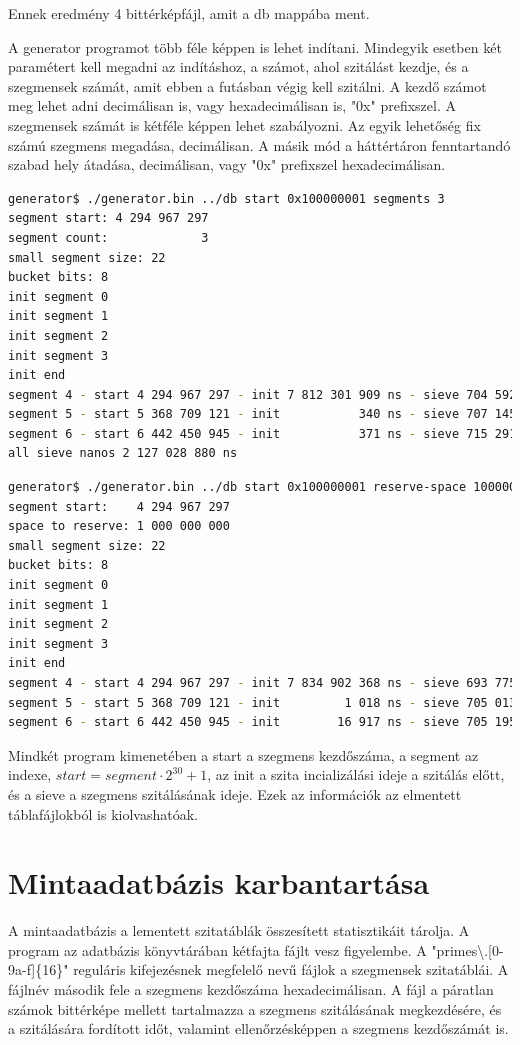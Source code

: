 \documentclass[12pt]{report}
\begin{document}
Ennek eredmény 4 bittérképfájl, amit a db mappába ment.

A generator programot több féle képpen is lehet indítani.
Mindegyik esetben két paramétert kell megadni az indításhoz,
a számot, ahol szitálást kezdje, és a szegmensek számát, amit
ebben a futásban végig kell szitálni.
A kezdő számot meg lehet adni decimálisan is, vagy hexadecimálisan is,
"0x" prefixszel. A szegmensek számát is kétféle képpen lehet szabályozni.
Az egyik lehetőség fix számú szegmens megadása, decimálisan.
A másik mód a háttértáron fenntartandó szabad hely átadása, decimálisan,
vagy "0x" prefixszel hexadecimálisan.

\tiny
\begin{lstlisting}[language=bash]
generator$ ./generator.bin ../db start 0x100000001 segments 3
segment start: 4 294 967 297
segment count:             3
small segment size: 22
bucket bits: 8
init segment 0
init segment 1
init segment 2
init segment 3
init end
segment 4 - start 4 294 967 297 - init 7 812 301 909 ns - sieve 704 592 094 ns
segment 5 - start 5 368 709 121 - init           340 ns - sieve 707 145 420 ns
segment 6 - start 6 442 450 945 - init           371 ns - sieve 715 291 366 ns
all sieve nanos 2 127 028 880 ns
\end{lstlisting}
\small

\tiny
\begin{lstlisting}[language=bash]
generator$ ./generator.bin ../db start 0x100000001 reserve-space 1000000000
segment start:    4 294 967 297
space to reserve: 1 000 000 000
small segment size: 22
bucket bits: 8
init segment 0
init segment 1
init segment 2
init segment 3
init end
segment 4 - start 4 294 967 297 - init 7 834 902 368 ns - sieve 693 775 928 ns
segment 5 - start 5 368 709 121 - init         1 018 ns - sieve 705 013 333 ns
segment 6 - start 6 442 450 945 - init        16 917 ns - sieve 705 195 144 ns
\end{lstlisting}
\small

Mindkét program kimenetében a start a szegmens kezdőszáma, a segment az indexe,
$start=segment \cdot 2^{30}+1$, az init a szita incializálási ideje a szitálás előtt,
és a sieve a szegmens szitálásának ideje. Ezek az információk az elmentett
táblafájlokból is kiolvashatóak.

\section{Mintaadatbázis karbantartása}

A mintaadatbázis a lementett szitatáblák összesített statisztikáit tárolja.
A program az adatbázis könyvtárában kétfajta fájlt vesz figyelembe.
A "primes\textbackslash.[0-9a-f]\{16\}" reguláris kifejezésnek megfelelő nevű
fájlok a szegmensek szitatáblái.
A fájlnév második fele a szegmens kezdőszáma hexadecimálisan.
A fájl a páratlan számok bittérképe mellett tartalmazza a szegmens
szitálásának megkezdésére, és a szitálására fordított időt,
valamint ellenőrzésképpen a szegmens kezdőszámát is.
\end{document}
